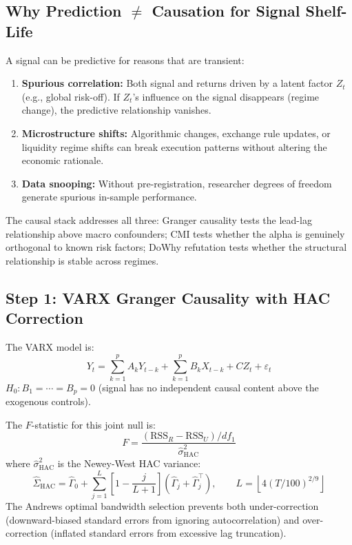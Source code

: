 \documentclass[11pt]{article}
\begin{document}
\subsection{Why Prediction $\neq$ Causation for Signal Shelf-Life}

A signal can be predictive for reasons that are transient:
\begin{enumerate}
\item \textbf{Spurious correlation:} Both signal and returns driven by a latent factor $Z_t$ (e.g., global risk-off). If $Z_t$'s influence on the signal disappears (regime change), the predictive relationship vanishes.
\item \textbf{Microstructure shifts:} Algorithmic changes, exchange rule updates, or liquidity regime shifts can break execution patterns without altering the economic rationale.
\item \textbf{Data snooping:} Without pre-registration, researcher degrees of freedom generate spurious in-sample performance.
\end{enumerate}
The causal stack addresses all three: Granger causality tests the lead-lag relationship above macro confounders; CMI tests whether the alpha is genuinely orthogonal to known risk factors; DoWhy refutation tests whether the structural relationship is stable across regimes.

\subsection{Step 1: VARX Granger Causality with HAC Correction}

The VARX model is:
\begin{equation}
Y_t = \sum_{k=1}^{p} A_k Y_{t-k} + \sum_{k=1}^{p} B_k X_{t-k} + C Z_t + \varepsilon_t
\label{eq:varx}
\end{equation}
$H_0: B_1 = \cdots = B_p = 0$ (signal has no independent causal content above the exogenous controls).

The $F$-statistic for this joint null is:
\begin{equation}
F = \frac{(\text{RSS}_R - \text{RSS}_U)/df_1}{\hat{\sigma}^2_{\text{HAC}}}
\label{eq:f-stat}
\end{equation}
where $\hat{\sigma}^2_{\text{HAC}}$ is the Newey-West HAC variance:
\begin{equation}
\hat{\Sigma}_{\text{HAC}} = \hat{\Gamma}_0 + \sum_{j=1}^{L} \left[1 - \frac{j}{L+1}\right]\left(\hat{\Gamma}_j + \hat{\Gamma}_j^\top\right), \qquad L = \left\lfloor 4(T/100)^{2/9} \right\rfloor
\label{eq:hac-variance}
\end{equation}
The Andrews optimal bandwidth selection prevents both under-correction (downward-biased standard errors from ignoring autocorrelation) and over-correction (inflated standard errors from excessive lag truncation).
\end{document}
